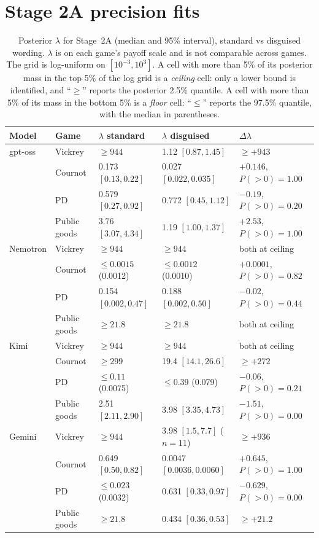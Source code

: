 \documentclass[10pt]{article}
\theoremstyle{definition}
\theoremstyle{remark}
\newcommand{\lam}{\lambda}
\begin{document}
\section{Stage 2A precision fits}\label{app:lambda}

\begin{table}[h]
\centering
\caption{Posterior $\lam$ for Stage~2A (median and 95\% interval), standard vs disguised wording.
$\lam$ is on each game's payoff scale and is not comparable across games. The grid is
log-uniform on $[10^{-3},10^{3}]$. A cell with more than 5\% of its posterior mass in the top
5\% of the log grid is a \emph{ceiling} cell: only a lower bound is identified, and ``$\ge$''
reports the posterior 2.5\% quantile. A cell with more than 5\% of its mass in the bottom 5\% is a
\emph{floor} cell: ``$\le$'' reports the 97.5\% quantile, with the median in parentheses.}
\label{tab:lambda}
\small
\begin{tabular}{@{}lllll@{}}
\toprule
Model & Game & $\lam$ standard & $\lam$ disguised & $\Delta\lam$ \\
\midrule
gpt-oss & Vickrey & $\ge944$ & 1.12 $[0.87,1.45]$ & $\ge+943$ \\
 & Cournot & 0.173 $[0.13,0.22]$ & 0.027 $[0.022,0.035]$ & $+0.146$, $P(>0)=1.00$ \\
 & PD & 0.579 $[0.27,0.92]$ & 0.772 $[0.45,1.12]$ & $-0.19$, $P(>0)=0.20$ \\
 & Public goods & 3.76 $[3.07,4.34]$ & 1.19 $[1.00,1.37]$ & $+2.53$, $P(>0)=1.00$ \\
Nemotron & Vickrey & $\ge944$ & $\ge944$ & both at ceiling \\
 & Cournot & $\le0.0015$ (0.0012) & $\le0.0012$ (0.0010) & $+0.0001$, $P(>0)=0.82$ \\
 & PD & 0.154 $[0.002,0.47]$ & 0.188 $[0.002,0.50]$ & $-0.02$, $P(>0)=0.44$ \\
 & Public goods & $\ge21.8$ & $\ge21.8$ & both at ceiling \\
Kimi & Vickrey & $\ge944$ & $\ge944$ & both at ceiling \\
 & Cournot & $\ge299$ & 19.4 $[14.1,26.6]$ & $\ge+272$ \\
 & PD & $\le0.11$ (0.0075) & $\le0.39$ (0.079) & $-0.06$, $P(>0)=0.21$ \\
 & Public goods & 2.51 $[2.11,2.90]$ & 3.98 $[3.35,4.73]$ & $-1.51$, $P(>0)=0.00$ \\
Gemini & Vickrey & $\ge944$ & 3.98 $[1.5,7.7]$ ($n=11$) & $\ge+936$ \\
 & Cournot & 0.649 $[0.50,0.82]$ & 0.0047 $[0.0036,0.0060]$ & $+0.645$, $P(>0)=1.00$ \\
 & PD & $\le0.023$ (0.0032) & 0.631 $[0.33,0.97]$ & $-0.629$, $P(>0)=0.00$ \\
 & Public goods & $\ge21.8$ & 0.434 $[0.36,0.53]$ & $\ge+21.2$ \\
\bottomrule
\end{tabular}
\end{table}
\end{document}
